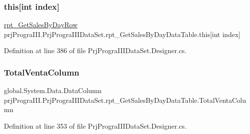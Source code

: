 \subsubsection{\texorpdfstring{this[int index]}{this[int index]}}
{\footnotesize\ttfamily \hyperlink{classprj_progra_i_i_i_1_1_prj_progra_i_i_i_data_set_1_1rpt___get_sales_by_day_row}{rpt\+\_\+\+Get\+Sales\+By\+Day\+Row} prj\+Progra\+I\+I\+I.\+Prj\+Progra\+I\+I\+I\+Data\+Set.\+rpt\+\_\+\+Get\+Sales\+By\+Day\+Data\+Table.\+this\mbox{[}int index\mbox{]}\hspace{0.3cm}{\ttfamily [get]}}



Definition at line 386 of file Prj\+Progra\+I\+I\+I\+Data\+Set.\+Designer.\+cs.

\hypertarget{classprj_progra_i_i_i_1_1_prj_progra_i_i_i_data_set_1_1rpt___get_sales_by_day_data_table_a09566d089e40e5e1ca261ac57779c84f}{}\label{classprj_progra_i_i_i_1_1_prj_progra_i_i_i_data_set_1_1rpt___get_sales_by_day_data_table_a09566d089e40e5e1ca261ac57779c84f} 
\subsubsection{\texorpdfstring{Total\+Venta\+Column}{TotalVentaColumn}}
{\footnotesize\ttfamily global.\+System.\+Data.\+Data\+Column prj\+Progra\+I\+I\+I.\+Prj\+Progra\+I\+I\+I\+Data\+Set.\+rpt\+\_\+\+Get\+Sales\+By\+Day\+Data\+Table.\+Total\+Venta\+Column\hspace{0.3cm}{\ttfamily [get]}}



Definition at line 353 of file Prj\+Progra\+I\+I\+I\+Data\+Set.\+Designer.\+cs.



